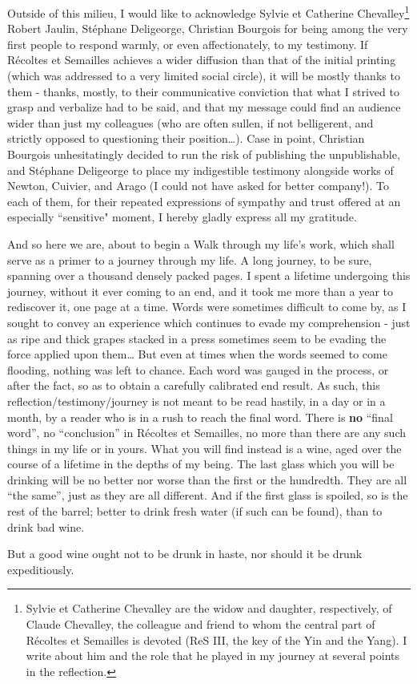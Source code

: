 Outside of this milieu, I would like to acknowledge 
Sylvie et Catherine Chevalley\footnote{Sylvie et Catherine Chevalley are the widow and
daughter, respectively, of Claude Chevalley, the colleague and friend to whom the central part of 
R\'ecoltes et Semailles is devoted (ReS III, the key of the Yin and the Yang).
I write about him and the role that he played in my
journey at several points in the reflection.} Robert Jaulin, St\'ephane Deligeorge, Christian Bourgois for being among the very first people to respond warmly, or even affectionately, to my testimony. 
If R\'ecoltes et Semailles achieves a wider diffusion than that of the initial 
printing (which was addressed to a very limited social circle), it will be mostly thanks to
them - thanks, mostly, to their communicative 
conviction that what I strived to grasp and verbalize had to be said, and that my message could find an audience wider than just my colleagues (who are often sullen,
if not belligerent, and strictly opposed to questioning their position\ldots).
Case in point, Christian Bourgois unhesitatingly decided to run the risk of publishing the unpublishable, and St\'ephane Deligeorge to place my 
indigestible testimony alongside works of Newton, Cuivier, and Arago (I could not have asked for
better company!).
To each of them, for their repeated expressions of sympathy and trust offered at an
especially ``sensitive" moment, I hereby gladly express all my gratitude. 

And so here we are, about to begin a Walk through my life's work, which shall serve as a primer to
a journey through my life. 
A long journey, to be sure, spanning over a thousand densely packed pages. I spent a lifetime undergoing this journey, without it ever 
coming to an end, and it took me more than a year to rediscover it, 
one page at a time.
Words were sometimes difficult to come by, as I sought to convey an experience which continues to evade my comprehension - just as ripe and thick grapes stacked in a press sometimes seem to be evading the force applied upon them\ldots
But even at times when the words seemed to come flooding, nothing was left to chance. 
Each word was gauged in the process, or after the fact, so as to obtain a carefully calibrated end result. As such, this reflection/testimony/journey is not meant to be read hastily, in a day or in a
month, by a reader who is in a rush to reach the final word. There is \textbf{no} 
``final word'', no
``conclusion'' in 
R\'ecoltes et Semailles, no more than there are any such things in my life or in yours. 
What you will find instead is a wine, aged over the course of a lifetime in the depths of my being.
The last glass which you will be drinking will be no better nor worse than the first or the
hundredth. 
They are all ``the same'', just as they are all different. And if the first glass is spoiled,
so is the rest of the barrel; better to drink fresh water (if such can be found),
than to drink bad wine. 

But a good wine ought not to be drunk in haste, nor should it be drunk expeditiously. 

%
